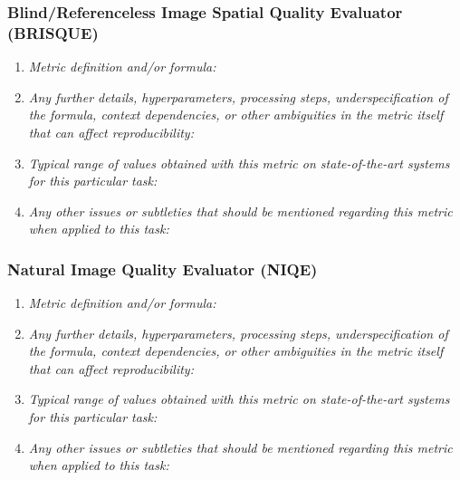 \documentclass[a4paper,11pt]{article}
\begin{document}
        \subsubsection{Blind/Referenceless Image Spatial Quality Evaluator (BRISQUE)}
            \begin{enumerate}[label=\alph*.]
                \item \textit{Metric definition and/or formula:}
                \bigskip
                \item \textit{Any further details, hyperparameters, processing steps, underspecification of the formula, context dependencies, or other ambiguities in the metric itself that can affect reproducibility:}
                \bigskip
                \item \textit{Typical range of values obtained with this metric on state-of-the-art systems for this particular task:}
                \bigskip
                \item \textit{Any other issues or subtleties that should be mentioned regarding this metric when applied to this task:}
                \bigskip
            \end{enumerate}
        \subsubsection{Natural Image Quality Evaluator (NIQE)}
            \begin{enumerate}[label=\alph*.]
                \item \textit{Metric definition and/or formula:}
                \bigskip
                \item \textit{Any further details, hyperparameters, processing steps, underspecification of the formula, context dependencies, or other ambiguities in the metric itself that can affect reproducibility:}
                \bigskip
                \item \textit{Typical range of values obtained with this metric on state-of-the-art systems for this particular task:}
                \bigskip
                \item \textit{Any other issues or subtleties that should be mentioned regarding this metric when applied to this task:}
                \bigskip
            \end{enumerate}
\end{document}
